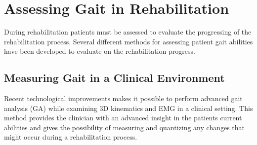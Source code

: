 \section{Assessing Gait in Rehabilitation}

During rehabilitation patients must be assessed to evaluate the progressing of the rehabilitation process. Several different methods for assessing patient gait abilities have been developed to evaluate on the rehabilitation progress. %

\subsection{Measuring Gait in a Clinical Environment}

Recent technological improvements makes it possible to perform advanced gait analysis (GA) while examining 3D kinematics and EMG in a clinical setting. This method provides the clinician with an advanced insight in the patients current abilities and gives the possibility of measuring and quantizing any changes that might occur during a rehabilitation process. \cite{Sandrini2018}

